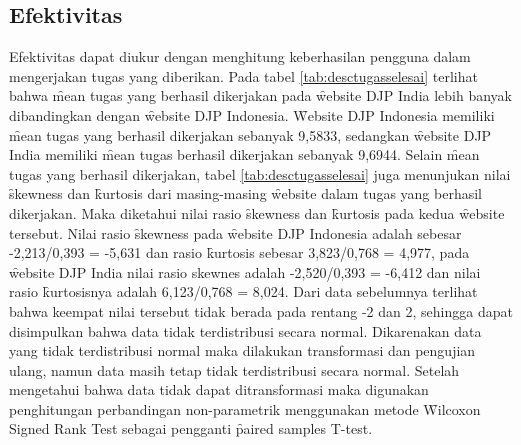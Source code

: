 \subsection{Efektivitas}
Efektivitas dapat diukur dengan menghitung keberhasilan pengguna dalam mengerjakan tugas yang diberikan. Pada tabel \ref{tab:desctugasselesai} terlihat bahwa \f{mean} tugas yang berhasil dikerjakan pada \f{website} DJP India lebih banyak dibandingkan dengan \f{website} DJP Indonesia. \f{Website} DJP Indonesia memiliki \f{mean} tugas yang berhasil dikerjakan sebanyak 9,5833, sedangkan \f{website} DJP India memiliki \f{mean} tugas berhasil dikerjakan sebanyak 9,6944. Selain \f{mean} tugas yang berhasil dikerjakan, tabel \ref{tab:desctugasselesai} juga menunjukan nilai \f{skewness} dan \f{kurtosis} dari masing-masing \f{website} dalam tugas yang berhasil dikerjakan. Maka diketahui nilai rasio \f{skewness} dan \f{kurtosis} pada kedua \f{website} tersebut. Nilai rasio \f{skewness} pada \f{website} DJP Indonesia adalah sebesar -2,213/0,393 = -5,631 dan rasio \f{kurtosis} sebesar 3,823/0,768 = 4,977, pada \f{website} DJP India nilai rasio skewnes adalah -2,520/0,393 = -6,412 dan nilai rasio \f{kurtosis}nya adalah 6,123/0,768 = 8,024. Dari data sebelumnya terlihat bahwa keempat nilai tersebut tidak berada pada rentang -2 dan 2, sehingga dapat disimpulkan bahwa data tidak terdistribusi secara normal. Dikarenakan data yang tidak terdistribusi normal maka dilakukan transformasi dan pengujian ulang, namun data masih tetap tidak terdistribusi secara normal. Setelah mengetahui bahwa data tidak dapat ditransformasi maka digunakan penghitungan perbandingan non-parametrik menggunakan metode \f{Wilcoxon Signed Rank Test} sebagai pengganti \f{paired samples T-test}.

